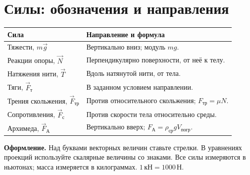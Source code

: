 \documentclass[a4paper,12pt]{article}
\newcommand{\fr}{F_{\text{тр}}}
\newcommand{\fa}{F_{\text{А}}}
\newcommand{\unit}[1]{\,\text{#1}}
\newcommand{\N}{\unit{Н}}
\begin{document}
\section{Силы: обозначения и направления}
{\renewcommand{\arraystretch}{1.2}\begin{tabularx}{\linewidth}{@{}p{4.0cm}X@{}}
\toprule Сила & Направление и формула \\\midrule
Тяжести, $m\vec g$ & Вертикально вниз; модуль $mg$.\\
Реакции опоры, $\vec N$ & Перпендикулярно поверхности, от неё к телу.\\
Натяжения нити, $\vec T$ & Вдоль натянутой нити, от тела.\\
Тяги, $\vec F_{\text{т}}$ & В заданном условием направлении.\\
Трения скольжения, $\vec F_{\text{тр}}$ & Против относительного скольжения; $\fr=\mu N$.\\
Сопротивления, $\vec F_{\text{с}}$ & Против скорости тела относительно среды.\\
Архимеда, $\vec F_{\text{А}}$ & Вертикально вверх; $\fa=\rho_{\text{ср}}gV_{\text{погр}}$.\\\bottomrule
\end{tabularx}}
\textbf{Оформление.} Над буквами векторных величин ставьте стрелки. В уравнениях проекций используйте скалярные величины со знаками. Все силы измеряются в ньютонах; масса измеряется в килограммах. $1\unit{кН}=1000\N$.
\clearpage
\end{document}
